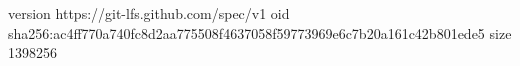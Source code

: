 version https://git-lfs.github.com/spec/v1
oid sha256:ac4ff770a740fc8d2aa775508f4637058f59773969e6c7b20a161c42b801ede5
size 1398256
